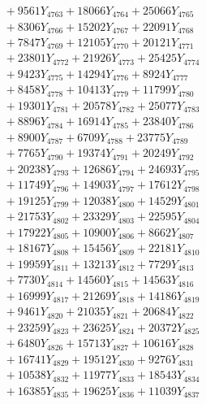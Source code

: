 \documentclass[a4paper,10pt]{article}
\begin{document}
{\begin{align}
&\;  + 9561 Y_{4763} + 18066 Y_{4764} + 25066 Y_{4765} \\[0.3ex]
&\;  + 8306 Y_{4766} + 15202 Y_{4767} + 22091 Y_{4768} \\[0.5ex]\allowbreak
&\;  + 7847 Y_{4769} + 12105 Y_{4770} + 20121 Y_{4771} \\[0.3ex]
&\;  + 23801 Y_{4772} + 21926 Y_{4773} + 25425 Y_{4774} \\[0.3ex]
&\;  + 9423 Y_{4775} + 14294 Y_{4776} + 8924 Y_{4777} \\[0.3ex]
&\;  + 8458 Y_{4778} + 10413 Y_{4779} + 11799 Y_{4780} \\[0.3ex]
&\;  + 19301 Y_{4781} + 20578 Y_{4782} + 25077 Y_{4783} \\[0.3ex]
&\;  + 8896 Y_{4784} + 16914 Y_{4785} + 23840 Y_{4786} \\[0.3ex]
&\;  + 8900 Y_{4787} + 6709 Y_{4788} + 23775 Y_{4789} \\[0.3ex]
&\;  + 7765 Y_{4790} + 19374 Y_{4791} + 20249 Y_{4792} \\[0.3ex]
&\;  + 20238 Y_{4793} + 12686 Y_{4794} + 24693 Y_{4795} \\[0.3ex]
&\;  + 11749 Y_{4796} + 14903 Y_{4797} + 17612 Y_{4798} \\[0.5ex]\allowbreak
&\;  + 19125 Y_{4799} + 12038 Y_{4800} + 14529 Y_{4801} \\[0.3ex]
&\;  + 21753 Y_{4802} + 23329 Y_{4803} + 22595 Y_{4804} \\[0.3ex]
&\;  + 17922 Y_{4805} + 10900 Y_{4806} + 8662 Y_{4807} \\[0.3ex]
&\;  + 18167 Y_{4808} + 15456 Y_{4809} + 22181 Y_{4810} \\[0.3ex]
&\;  + 19959 Y_{4811} + 13213 Y_{4812} + 7729 Y_{4813} \\[0.3ex]
&\;  + 7730 Y_{4814} + 14560 Y_{4815} + 14563 Y_{4816} \\[0.3ex]
&\;  + 16999 Y_{4817} + 21269 Y_{4818} + 14186 Y_{4819} \\[0.3ex]
&\;  + 9461 Y_{4820} + 21035 Y_{4821} + 20684 Y_{4822} \\[0.3ex]
&\;  + 23259 Y_{4823} + 23625 Y_{4824} + 20372 Y_{4825} \\[0.3ex]
&\;  + 6480 Y_{4826} + 15713 Y_{4827} + 10616 Y_{4828} \\[0.5ex]\allowbreak
&\;  + 16741 Y_{4829} + 19512 Y_{4830} + 9276 Y_{4831} \\[0.3ex]
&\;  + 10538 Y_{4832} + 11977 Y_{4833} + 18543 Y_{4834} \\[0.3ex]
&\;  + 16385 Y_{4835} + 19625 Y_{4836} + 11039 Y_{4837} \\[0.3ex]

\end{align}}
\end{document}
